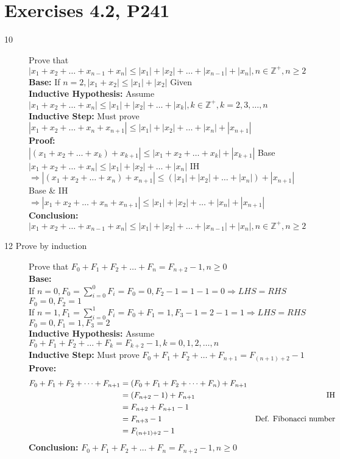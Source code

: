 \documentclass[a4paper]{article}
\begin{document}
\section*{Exercises 4.2, P241}
\begin{description}


\item[10] Prove that $| x_1+x_2+\dots+x_{n-1}+x_n|\leq|x_1|+|x_2|+\dots+|x_{n-1}|+|x_n|,n\in\mathbb{Z}^+,n\ge2 $\\
\textbf{Base:} If $n=2, |x_1+x_2|\leq|x_1|+|x_2|$ \hfill Given\\
\textbf{Inductive Hypothesis:} Assume $|x_1+x_2+\dots+x_n|\leq|x_1|+|x_2|+\dots+|x_k|,k\in\mathbb{Z}^+,k=2,3,\dots,n$\\
\textbf{Inductive Step:} Must prove $|x_1+x_2+\dots+x_n+x_{n+1}|\leq|x_1|+|x_2|+\dots+|x_n|+|x_{n+1}|$\\
\textbf{Proof:}\\
$|(x_1+x_2+\dots+x_k)+x_{k+1}|\leq|x_1+x_2+\dots+x_k|+|x_{k+1}| $ \hfill Base\\
$|x_1+x_2+\dots+x_n|\leq|x_1|+|x_2|+\dots+|x_n|$ \hfill IH\\
$\Rightarrow |(x_1+x_2+\dots+x_n)+x_{n+1}|\leq(|x_1|+|x_2|+\dots+|x_n|)+|x_{n+1}| $ \hfill Base \& IH\\
$\Rightarrow |x_1+x_2+\dots+x_n+x_{n+1}|\leq|x_1|+|x_2|+\dots+|x_n|+|x_{n+1}| $ \hfill \\
\textbf{Conclusion: }$| x_1+x_2+\dots+x_{n-1}+x_n|\leq|x_1|+|x_2|+\dots+|x_{n-1}|+|x_n|,n\in\mathbb{Z}^+,n\ge2 $

\item[12 Prove by induction] Prove that $F_0+F_1+F_2+\dots+F_n=F_{n+2}-1,n\ge0 $\\
\textbf{Base:} \\
If $n=0, F_0=\sum_{i=0}^0 F_i=F_0=0, F_2-1=1-1=0\Rightarrow LHS=RHS$ \hfill $F_0=0, F_2=1$\\
If $n=1, F_1=\sum_{i=0}^1 F_i=F_0+F_1=1, F_3-1=2-1=1\Rightarrow LHS=RHS$ \hfill $F_0=0, F_1=1,F_3=2$\\
\textbf{Inductive Hypothesis:} Assume $F_0+F_1+F_2+\dots+F_k=F_{k+2}-1,k=0,1,2,\dots,n$\\
\textbf{Inductive Step:} Must prove $F_0+F_1+F_2+\dots+F_{n+1}=F_{(n+1)+2}-1$\\
\textbf{Prove:}\\
\begin{align*}
    F_0+F_1+F_2+\dots+F_{n+1} & = (F_0+F_1+F_2+\dots+F_n)+F_{n+1}\\
    & = (F_{n+2}-1)+F_{n+1} & \hfill \text{IH} \\
    & = F_{n+2}+F_{n+1}-1 & \hfill \text{} \\
    & = F_{n+3}-1 & \hfill \text{Def. Fibonacci number} \\
    & = F_{(n+1)+2}-1 & \hfill \text{} \\
\end{align*}
\textbf{Conclusion: }$F_0+F_1+F_2+\dots+F_n=F_{n+2}-1,n\ge0 $


\end{description}
\end{document}
